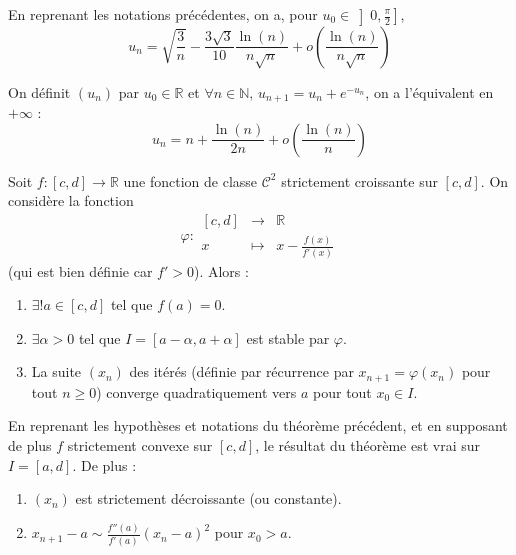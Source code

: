 	\begin{proposition}
		En reprenant les notations précédentes, on a, pour $u_0 \in \left] 0, \frac{\pi}{2} \right]$,
		\[ u_n = \sqrt{\frac{3}{n}} - \frac{3 \sqrt{3}}{10} \frac{\ln(n)}{n\sqrt{n}} + o\left( \frac{\ln(n)}{n\sqrt{n}} \right) \]
	\end{proposition}


	\begin{example}
		On définit $(u_n)$ par $u_0 \in \mathbb{R}$ et $\forall n \in \mathbb{N}, \, u_{n+1} = u_n + e^{-u_n}$, on a l'équivalent en $+\infty$ :
		\[ u_n = n + \frac{\ln(n)}{2n} + o\left( \frac{\ln(n)}{n} \right) \]
	\end{example}


	\begin{theorem}
		Soit $f : [c, d] \rightarrow \mathbb{R}$ une fonction de classe $\mathcal{C}^2$ strictement croissante sur $[c, d]$. On considère la fonction
		\[ \varphi :
		\begin{array}{ccc}
			[c, d] &\rightarrow& \mathbb{R} \\
			x &\mapsto& x - \frac{f(x)}{f'(x)}
		\end{array}
		\]
		(qui est bien définie car $f' > 0$). Alors :
		\begin{enumerate}[label=(\roman*)]
			\item $\exists! a \in [c, d]$ tel que $f(a) = 0$.
			\item $\exists \alpha > 0$ tel que $I = [a - \alpha, a + \alpha]$ est stable par $\varphi$.
			\item La suite $(x_n)$ des itérés (définie par récurrence par $x_{n+1} = \varphi(x_n)$ pour tout $n \geq 0$) converge quadratiquement vers $a$ pour tout $x_0 \in I$.
		\end{enumerate}
	\end{theorem}

	\begin{corollary}
		En reprenant les hypothèses et notations du théorème précédent, et en supposant de plus $f$ strictement convexe sur $[c, d]$, le résultat du théorème est vrai sur $I = [a, d]$. De plus :
		\begin{enumerate}[label=(\roman*)]
			\item $(x_n)$ est strictement décroissante (ou constante).
			\item $x_{n+1} - a \sim \frac{f''(a)}{f'(a)} (x_n - a)^2$ pour $x_0 > a$.
		\end{enumerate}
	\end{corollary}

